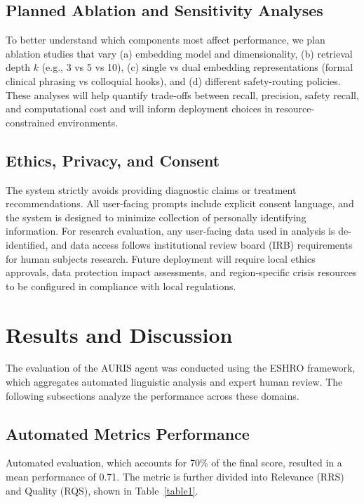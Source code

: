 \documentclass[sigconf]{acmart}
\begin{document}
\subsection{Planned Ablation and Sensitivity Analyses}

To better understand which components most affect performance, we plan ablation studies that vary (a) embedding model and dimensionality, (b) retrieval depth $k$ (e.g., 3 vs 5 vs 10), (c) single vs dual embedding representations (formal clinical phrasing vs colloquial hooks), and (d) different safety-routing policies. These analyses will help quantify trade-offs between recall, precision, safety recall, and computational cost and will inform deployment choices in resource-constrained environments.

\subsection{Ethics, Privacy, and Consent}

The system strictly avoids providing diagnostic claims or treatment recommendations. All user-facing prompts include explicit consent language, and the system is designed to minimize collection of personally identifying information. For research evaluation, any user-facing data used in analysis is de-identified, and data access follows institutional review board (IRB) requirements for human subjects research. Future deployment will require local ethics approvals, data protection impact assessments, and region-specific crisis resources to be configured in compliance with local regulations.
\section{Results and Discussion}

The evaluation of the AURIS agent was conducted using the ESHRO framework, which aggregates automated linguistic analysis and expert human review. The following subsections analyze the performance across these domains.

\subsection{Automated Metrics Performance}

Automated evaluation, which accounts for 70\% of the final score, resulted in a mean performance of 0.71. The metric is further divided into Relevance (RRS) and Quality (RQS), shown in Table~\ref{table1}.
\end{document}
